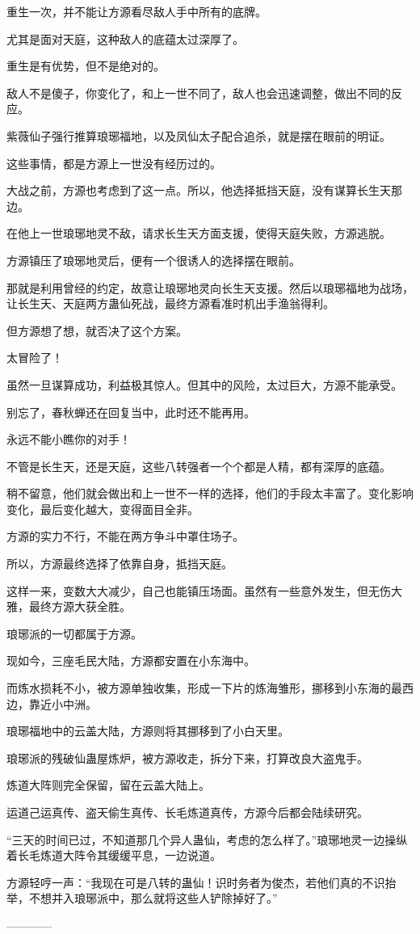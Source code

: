 \begin{this_body}
重生一次，并不能让方源看尽敌人手中所有的底牌。

尤其是面对天庭，这种敌人的底蕴太过深厚了。

重生是有优势，但不是绝对的。

敌人不是傻子，你变化了，和上一世不同了，敌人也会迅速调整，做出不同的反应。

紫薇仙子强行推算琅琊福地，以及凤仙太子配合追杀，就是摆在眼前的明证。

这些事情，都是方源上一世没有经历过的。

大战之前，方源也考虑到了这一点。所以，他选择抵挡天庭，没有谋算长生天那边。

在他上一世琅琊地灵不敌，请求长生天方面支援，使得天庭失败，方源逃脱。

方源镇压了琅琊地灵后，便有一个很诱人的选择摆在眼前。

那就是利用曾经的约定，故意让琅琊地灵向长生天支援。然后以琅琊福地为战场，让长生天、天庭两方蛊仙死战，最终方源看准时机出手渔翁得利。

但方源想了想，就否决了这个方案。

太冒险了！

虽然一旦谋算成功，利益极其惊人。但其中的风险，太过巨大，方源不能承受。

别忘了，春秋蝉还在回复当中，此时还不能再用。

永远不能小瞧你的对手！

不管是长生天，还是天庭，这些八转强者一个个都是人精，都有深厚的底蕴。

稍不留意，他们就会做出和上一世不一样的选择，他们的手段太丰富了。变化影响变化，最后变化越大，变得面目全非。

方源的实力不行，不能在两方争斗中罩住场子。

所以，方源最终选择了依靠自身，抵挡天庭。

这样一来，变数大大减少，自己也能镇压场面。虽然有一些意外发生，但无伤大雅，最终方源大获全胜。

琅琊派的一切都属于方源。

现如今，三座毛民大陆，方源都安置在小东海中。

而炼水损耗不小，被方源单独收集，形成一下片的炼海雏形，挪移到小东海的最西边，靠近小中洲。

琅琊福地中的云盖大陆，方源则将其挪移到了小白天里。

琅琊派的残破仙蛊屋炼炉，被方源收走，拆分下来，打算改良大盗鬼手。

炼道大阵则完全保留，留在云盖大陆上。

运道己运真传、盗天偷生真传、长毛炼道真传，方源今后都会陆续研究。

“三天的时间已过，不知道那几个异人蛊仙，考虑的怎么样了。”琅琊地灵一边操纵着长毛炼道大阵令其缓缓平息，一边说道。

方源轻哼一声：“我现在可是八转的蛊仙！识时务者为俊杰，若他们真的不识抬举，不想并入琅琊派中，那么就将这些人铲除掉好了。”

------------

\end{this_body}

